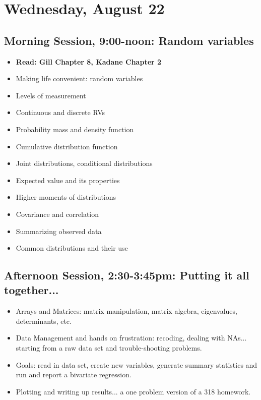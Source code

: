 \documentclass[12pt,a4paper]{article}
\begin{document}
\section*{Wednesday, August 22}
\subsection*{Morning Session, 9:00-noon: Random variables}
\begin{itemize}
\setlength{\itemsep}{0pt}
\footnotesize
\item \textbf{Read: Gill Chapter 8, Kadane Chapter 2}
\item Making life convenient: random variables
\item Levels of measurement
\item Continuous and discrete RVs
\item Probability mass and density function
\item Cumulative distribution function
\item Joint distributions, conditional distributions
\item Expected value and its properties
\item Higher moments of distributions
\item Covariance and correlation
\item Summarizing observed data
\item Common distributions and their use
\end{itemize}



\subsection*{Afternoon Session, 2:30-3:45pm: Putting it all together...}
\begin{itemize}
\setlength{\itemsep}{0pt}
\footnotesize
\item Arrays and Matrices: matrix manipulation, matrix algebra, eigenvalues, determinants, etc.
\item Data Management and hands on frustration: recoding, dealing with NAs... starting from a raw data set and trouble-shooting problems.
\item Goals: read in data set, create new variables, generate summary statistics and run and report a bivariate regression.
\item Plotting and writing up results... a one problem version of a 318 homework.
\end{itemize}


 
\end{document}
